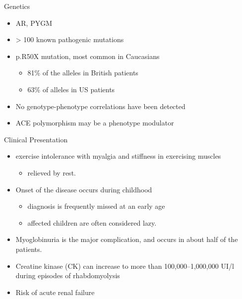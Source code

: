 \documentclass[presentation, smaller]{beamer}
\begin{document}
\begin{frame}[label={sec:org88d5288}]{Genetics}
\begin{itemize}
\item AR, PYGM
\item \textgreater{} 100 known pathogenic mutations
\item p.R50X mutation, most common in Caucasians
\begin{itemize}
\item 81\% of the alleles in British patients
\item 63\% of alleles in US patients
\end{itemize}
\item No genotype-phenotype correlations have been detected
\item ACE polymorphism may be a phenotype modulator
\end{itemize}
\end{frame}

\begin{frame}[label={sec:org1fdcaae}]{Clinical Presentation}
\begin{itemize}
\item exercise intolerance with myalgia and stiffness in exercising muscles
\begin{itemize}
\item relieved by rest.
\end{itemize}
\item Onset of the disease occurs during childhood
\begin{itemize}
\item diagnosis is frequently missed at an early age
\item affected children are often considered lazy.
\end{itemize}
\item Myoglobinuria is the major complication, and occurs in about half of
the patients.
\item Creatine kinase (CK) can increase to more than 100,000–1,000,000
UI/l during episodes of rhabdomyolysis
\item Risk of acute renal failure
\end{itemize}
\end{frame}
\end{document}

